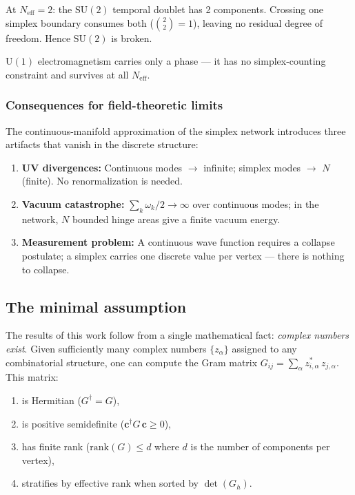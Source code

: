 \documentclass[12pt]{article}
\theoremstyle{remark}
\theoremstyle{definition}
\begin{document}
At $N_\text{eff} = 2$: the $\text{SU}(2)$ temporal doublet has 2 components. Crossing one simplex boundary consumes both ($\binom{2}{2} = 1$), leaving no residual degree of freedom. Hence $\text{SU}(2)$ is broken.

$\text{U}(1)$ electromagnetism carries only a phase --- it has no simplex-counting constraint and survives at all $N_\text{eff}$.

\subsubsection{Consequences for field-theoretic limits}

The continuous-manifold approximation of the simplex network introduces three artifacts that vanish in the discrete structure:

\begin{enumerate}
\item \textbf{UV divergences:} Continuous modes $\to$ infinite; simplex modes $\to$ $N$ (finite). No renormalization is needed.
\item \textbf{Vacuum catastrophe:} $\sum_k \omega_k/2 \to \infty$ over continuous modes; in the network, $N$ bounded hinge areas give a finite vacuum energy.
\item \textbf{Measurement problem:} A continuous wave function requires a collapse postulate; a simplex carries one discrete value per vertex --- there is nothing to collapse.
\end{enumerate}

\subsection{The minimal assumption}

The results of this work follow from a single mathematical fact: \emph{complex numbers exist}. Given sufficiently many complex numbers $\{z_\alpha\}$ assigned to any combinatorial structure, one can compute the Gram matrix $G_{ij} = \sum_\alpha z^*_{i,\alpha}\,z_{j,\alpha}$. This matrix:
\begin{enumerate}
\item is Hermitian ($G^\dagger = G$),
\item is positive semidefinite ($\mathbf{c}^\dagger G\,\mathbf{c} \geq 0$),
\item has finite rank ($\text{rank}(G) \leq d$ where $d$ is the number of components per vertex),
\item stratifies by effective rank when sorted by $\det(G_h)$.
\end{enumerate}
\end{document}
